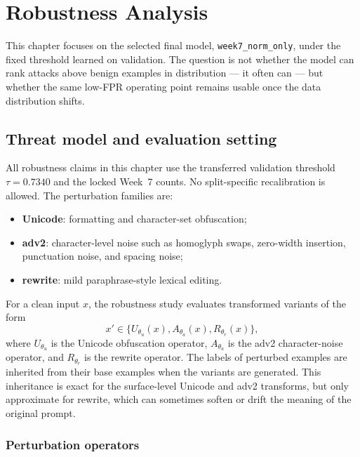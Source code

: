 \chapter{Robustness Analysis}
\label{ch:robustness}

This chapter focuses on the selected final model, \texttt{week7\_norm\_only}, under the fixed threshold learned on validation. The question is not whether the model can rank attacks above benign examples in distribution --- it often can --- but whether the same low-FPR operating point remains usable once the data distribution shifts.

\section{Threat model and evaluation setting}

All robustness claims in this chapter use the transferred validation threshold $\tau = 0.7340$ and the locked Week~7 counts. No split-specific recalibration is allowed. The perturbation families are:
\begin{itemize}
  \item \textbf{Unicode}: formatting and character-set obfuscation;
  \item \textbf{adv2}: character-level noise such as homoglyph swaps, zero-width insertion, punctuation noise, and spacing noise;
  \item \textbf{rewrite}: mild paraphrase-style lexical editing.
\end{itemize}

For a clean input $x$, the robustness study evaluates transformed variants of the form
\begin{equation}
  x' \in \{U_{\theta_u}(x), A_{\theta_a}(x), R_{\theta_r}(x)\},
\end{equation}
where $U_{\theta_u}$ is the Unicode obfuscation operator, $A_{\theta_a}$ is the adv2 character-noise operator, and $R_{\theta_r}$ is the rewrite operator. The labels of perturbed examples are inherited from their base examples when the variants are generated. This inheritance is exact for the surface-level Unicode and adv2 transforms, but only approximate for rewrite, which can sometimes soften or drift the meaning of the original prompt.

\subsection{Perturbation operators}


